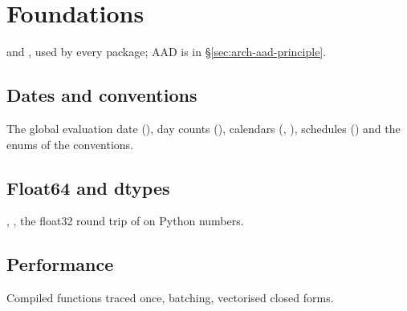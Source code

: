 \section{Foundations}\label{sec:arch-foundations}
 and , used by every package; AAD is in \S\ref{sec:arch-aad-principle}.

\subsection{Dates and conventions}\label{sec:arch-timehandles}
The global evaluation date (), day counts (), calendars
(, ), schedules () and the enums of the conventions.

\pending

\subsection{Float64 and dtypes}\label{sec:arch-dtypes}
, , the float32 round trip of  on Python numbers.

\pending

\subsection{Performance}\label{sec:arch-performance}
Compiled functions traced once, batching, vectorised closed forms.

\pending
